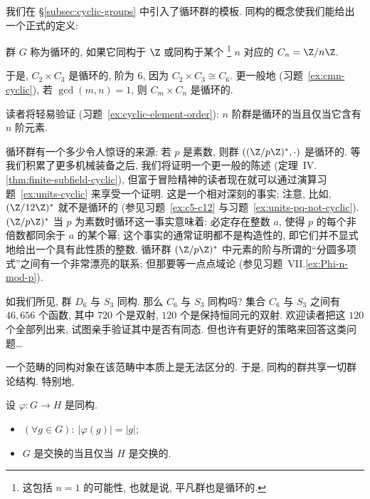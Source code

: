 \begin{example}
\label{ex:units-prime}
我们在 \S\ref{subsec:cyclic-groups} 中引入了循环群的模板. 同构的概念使我们能给出一个正式的定义:
\end{example}

\begin{definition}
\label{def:cyclic}
群 $G$ 称为循环的, 如果它同构于 $\Z$ 或同构于某个%
\footnote{这包括 $n = 1$ 的可能性, 也就是说, 平凡群也是循环的.}%
$n$ 对应的 $C_n = \Z/n\Z$.
\end{definition}

于是, $C_2 \times C_3$ 是循环的, 阶为 $6$, 因为 $C_2 \times C_3 \cong C_6$. 更一般地 (习题~\ref{ex:cmn-cyclic}), 若 $\gcd(m, n) = 1$, 则 $C_m \times C_n$ 是循环的.

读者将轻易验证 (习题~\ref{ex:cyclic-element-order}): $n$ 阶群是循环的当且仅当它含有 $n$ 阶元素.

循环群有一个多少令人惊讶的来源: 若 $p$ 是素数, 则群 $((\Z/p\Z)^{*}, \cdot)$ 是循环的. 等我们积累了更多机械装备之后, 我们将证明一个更一般的陈述 (定理~IV.\ref{thm:finite-subfield-cyclic}), 但富于冒险精神的读者现在就可以通过演算习题~\ref{ex:units-cyclic} 来享受一个证明. 这是一个相对深刻的事实; 注意, 比如, $(\Z/12\Z)^{*}$ 就不是循环的 (参见习题~\ref{ex:c5-c12} 与习题~\ref{ex:units-pq-not-cyclic}). $(\Z/p\Z)^{*}$ 当 $p$ 为素数时循环这一事实意味着: 必定存在整数 $a$, 使得 $p$ 的每个非倍数都同余于 $a$ 的某个幂; 这个事实的通常证明都不是构造性的, 即它们并不显式地给出一个具有此性质的整数. 循环群 $(\Z/p\Z)^{*}$ 中元素的阶与所谓的``分圆多项式''之间有一个非常漂亮的联系; 但那要等一点点域论 (参见习题~VII.\ref{ex:Phi-n-mod-p}).

如我们所见, 群 $D_6$ 与 $S_3$ 同构. 那么 $C_6$ 与 $S_3$ 同构吗? 集合 $C_6$ 与 $S_3$ 之间有 $46{,}656$ 个函数, 其中 $720$ 个是双射, $120$ 个是保持恒同元的双射. 欢迎读者把这 $120$ 个全部列出来, 试图亲手验证其中是否有同态. 但也许有更好的策略来回答这类问题\ldots

一个范畴的同构对象在该范畴中本质上是无法区分的. 于是, 同构的群共享一切群论结构. 特别地,

\begin{proposition}
\label{prop:iso-preserves-order}
设 $\varphi : G \to H$ 是同构.
\begin{itemize}
	\item $(\forall g \in G): \ |\varphi(g)| = |g|$;
	\item $G$ 是交换的当且仅当 $H$ 是交换的.
\end{itemize}
\end{proposition}

